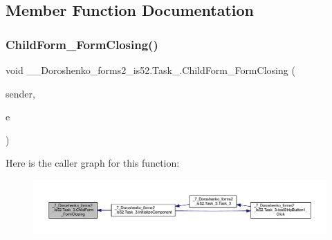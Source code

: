 \subsection{Member Function Documentation}
\hypertarget{class__7___doroshenko__forms2__is52_1_1_task__3_ace6c91c6e530342182ff7dea0bc29b68}{}\label{class__7___doroshenko__forms2__is52_1_1_task__3_ace6c91c6e530342182ff7dea0bc29b68} 
\subsubsection{\texorpdfstring{Child\+Form\+\_\+\+Form\+Closing()}{ChildForm\_FormClosing()}}
{\footnotesize\ttfamily void \+\_\+\_\+\+Doroshenko\+\_\+forms2\+\_\+is52.\+Task\+\_.\+Child\+Form\+\_\+\+Form\+Closing (\begin{DoxyParamCaption}\item[{object}]{sender,  }\item[{Form\+Closing\+Event\+Args}]{e }\end{DoxyParamCaption})\hspace{0.3cm}{\ttfamily [private]}}

Here is the caller graph for this function\+:
\nopagebreak
\begin{figure}[H]
\begin{center}
\leavevmode
\includegraphics[width=350pt]{class__7___doroshenko__forms2__is52_1_1_task__3_ace6c91c6e530342182ff7dea0bc29b68_icgraph}
\end{center}
\end{figure}
\hypertarget{class__7___doroshenko__forms2__is52_1_1_task__3_a71c3cdfc7a05accc3dbf0dc1dc342143}{}\label{class__7___doroshenko__forms2__is52_1_1_task__3_a71c3cdfc7a05accc3dbf0dc1dc342143} 

